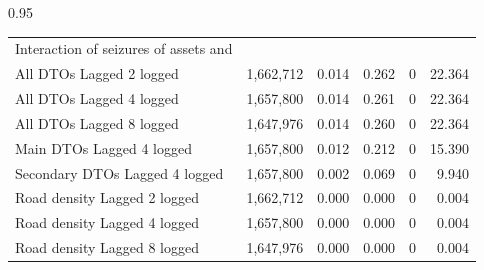 \documentclass[12pt,letterpaper]{article}
\begin{document}
\begin{table}[h!]
\begin{spacing}{0.95}
\begin{tabular}{lrrrrr}
	Interaction of seizures of assets and 	&		&		&		&		&		 \\
	\hspace{1em} All DTOs Lagged 2 logged	&	 1,662,712 	&	0.014	&	0.262	&	0	&	22.364	 \\
	\hspace{1em} All DTOs Lagged 4 logged	&	 1,657,800 	&	0.014	&	0.261	&	0	&	22.364	 \\
	\hspace{1em} All DTOs Lagged 8 logged	&	 1,647,976 	&	0.014	&	0.260	&	0	&	22.364	 \\
	\hspace{1em} Main DTOs Lagged 4 logged	&	 1,657,800 	&	0.012	&	0.212	&	0	&	15.390	 \\
	\hspace{1em} Secondary DTOs Lagged 4 logged	&	 1,657,800 	&	0.002	&	0.069	&	0	&	9.940	 \\
	\hspace{1em} Road density Lagged 2 logged	&	 1,662,712 	&	0.000	&	0.000	&	0	&	0.004	 \\
	\hspace{1em} Road density Lagged 4 logged	&	 1,657,800 	&	0.000	&	0.000	&	0	&	0.004	 \\
	\hspace{1em} Road density Lagged 8 logged	&	 1,647,976 	&	0.000	&	0.000	&	0	&	0.004	 \\
												

\end{tabular}
\end{spacing}
\end{table}
\end{document}
